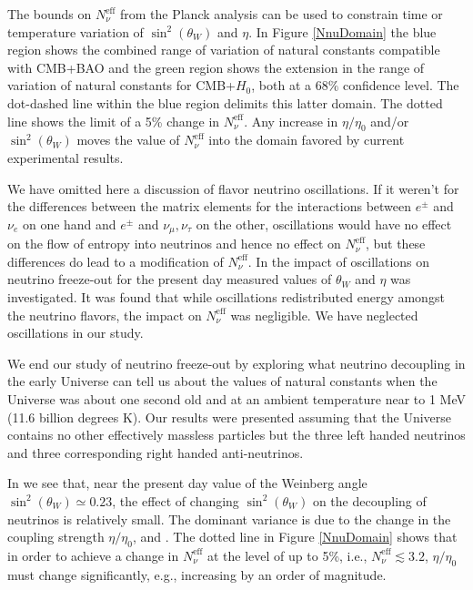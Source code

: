 The bounds on $N_\nu^{\mathrm{eff}}$ from the Planck analysis \cite{Planck:2013pxb} can be used to constrain time or temperature variation of $\sin^2(\theta_W)$ and $\eta$. 
In Figure \ref{NnuDomain} the blue region shows the combined range of variation of natural constants compatible with CMB+BAO and the green region shows the extension in the range of variation of natural constants for CMB+$H_0$, both at a $68\%$ confidence level. The dot-dashed line within the blue region delimits this latter domain. The dotted line shows the limit of a 5\% change in $N_\nu^{\mathrm{eff}}$. Any increase in $\eta/\eta_0$ and/or $\sin^2(\theta_W)$ moves the value of $N_\nu^{\mathrm{eff}}$ into the domain favored by current experimental results.

We have omitted here a discussion of flavor neutrino oscillations. If it weren't for the differences between the matrix elements for the interactions between $e^\pm$ and $\nu_e$ on one hand and $e^\pm$ and $\nu_\mu,\nu_\tau$ on the other, oscillations would have no effect on the flow of entropy into neutrinos and hence no effect on $N_\nu^{\mathrm{eff}}$, but these differences do lead to a modification of $N_\nu^{\mathrm{eff}}$. In \cite{Mangano:2005cc} the impact of oscillations on neutrino freeze-out for the present day measured values of $\theta_W$ and $\eta$ was investigated. It was found that while oscillations redistributed energy amongst the neutrino flavors, the impact on $N_\nu^{\mathrm{eff}}$ was negligible. We have neglected oscillations in our study.

We end our study of neutrino freeze-out by exploring what neutrino decoupling in the early Universe can tell us about the values of natural constants when the Universe was about one second old and at an ambient temperature near to 1 MeV (11.6 billion degrees K). Our results were presented assuming that the Universe contains no other effectively massless particles but the three left handed neutrinos and three corresponding right handed anti-neutrinos. 

In  we see that, near the present day value of the Weinberg angle $\sin^2(\theta_W)\simeq 0.23$, the effect of changing $\sin^2(\theta_W)$ on the decoupling of neutrinos is relatively small. The dominant variance is due to the change in the coupling strength $\eta/\eta_0$,  and . The dotted line in Figure \ref{NnuDomain} shows that in order to achieve a change in $N_\nu^{\mathrm{eff}}$ at the level of up to 5\%, i.e., $N_\nu^{\mathrm{eff}}\lesssim 3.2 $, $\eta/\eta_0$ must change significantly, e.g., increasing by an order of magnitude.

